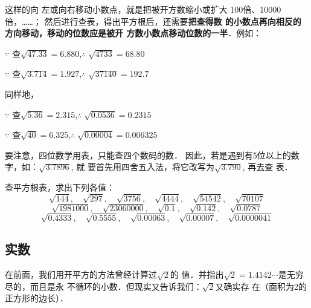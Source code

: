 这样的向
    左或向右移动小数点，就是把被开方数缩小或扩大
    100倍、10000倍，……；
然后进行查表，得出平方根后，还需要\textbf{把查得数
的小数点再向相反的方向移动，移动的位数应是被开
方数小数点移动位数的一半}．例如：
\begin{center}
\end{center}

$\because$ 查$\sqrt{47.33}=6.880$,\qquad $\therefore\; \sqrt{4733}=68.80$

$\because$ 查$\sqrt{3.714}=1.927$,\qquad $\therefore\; \sqrt{37140}=192.7$

同样地，


\begin{center}
\end{center}

$\because$ 查$\sqrt{5.36}=2.315$,\qquad $\therefore\; \sqrt{0.0536}=0.2315$

$\because$ 查$\sqrt{40}=6.325$,\qquad $\therefore\; \sqrt{0.00004}=0.006325$

要注意，四位数学用表，只能查四个数码的数．
因此，若是遇到有5位以上的数字，如：$\sqrt{3.7896}$, 就
要首先用四舍五入法，将它改写为$\sqrt{3.790}$, 再去查
表．

\begin{ex}
    查平方根表，求出下列各值：
\[\sqrt{144},\quad \sqrt{297},\quad \sqrt{3756},\quad \sqrt{4444},\quad \sqrt{54542},\quad \sqrt{70107} \]
\[\sqrt{1981000},\quad \sqrt{23060000},\quad \sqrt{0.1},\quad \sqrt{0.142},\quad \sqrt{0.0787} \]
\[\sqrt{0.4333},\quad \sqrt{0.5555},\quad \sqrt{0.00063},\quad \sqrt{0.00007},\quad \sqrt{0.0000041} \]
\end{ex}

\subsection{实数}
在前面，我们用开平方的方法曾经计算过$\sqrt{2}$的
值．并指出$\sqrt{2}=1.4142\cdots$是无穷尽的，而且是永
不循环的小数．但现实又告诉我们：$\sqrt{2}$又确实存
在（面积为2的正方形的边长）．

